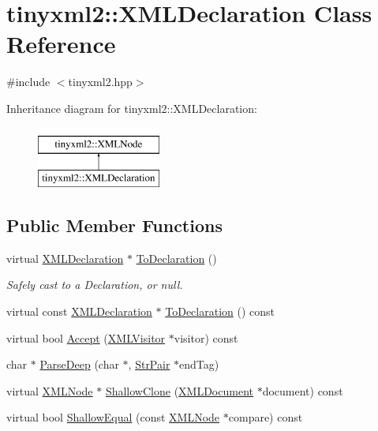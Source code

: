 \hypertarget{classtinyxml2_1_1_x_m_l_declaration}{\section{tinyxml2\-:\-:X\-M\-L\-Declaration Class Reference}
\label{classtinyxml2_1_1_x_m_l_declaration}
}


{\ttfamily \#include $<$tinyxml2.\-hpp$>$}

Inheritance diagram for tinyxml2\-:\-:X\-M\-L\-Declaration\-:\begin{figure}[H]
\begin{center}
\leavevmode
\includegraphics[height=2.000000cm]{classtinyxml2_1_1_x_m_l_declaration}
\end{center}
\end{figure}
\subsection*{Public Member Functions}
\begin{DoxyCompactItemize}
\item 
virtual \hyperlink{classtinyxml2_1_1_x_m_l_declaration}{X\-M\-L\-Declaration} $\ast$ \hyperlink{classtinyxml2_1_1_x_m_l_declaration_a159d8ac45865215e88059ea1e5b52fc5}{To\-Declaration} ()
\begin{DoxyCompactList}\small\item\em Safely cast to a Declaration, or null. \end{DoxyCompactList}\item 
virtual const \hyperlink{classtinyxml2_1_1_x_m_l_declaration}{X\-M\-L\-Declaration} $\ast$ \hyperlink{classtinyxml2_1_1_x_m_l_declaration_af724607a5fa810496fd6a21f5975a643}{To\-Declaration} () const 
\item 
virtual bool \hyperlink{classtinyxml2_1_1_x_m_l_declaration_a953a7359cc312d15218eb5843a4ca108}{Accept} (\hyperlink{classtinyxml2_1_1_x_m_l_visitor}{X\-M\-L\-Visitor} $\ast$visitor) const 
\item 
char $\ast$ \hyperlink{classtinyxml2_1_1_x_m_l_declaration_a19e33e0a9f9500f449261558c36f9a44}{Parse\-Deep} (char $\ast$, \hyperlink{classtinyxml2_1_1_str_pair}{Str\-Pair} $\ast$end\-Tag)
\item 
virtual \hyperlink{classtinyxml2_1_1_x_m_l_node}{X\-M\-L\-Node} $\ast$ \hyperlink{classtinyxml2_1_1_x_m_l_declaration_a39458732ee6796cfc85dd35d3c488e0b}{Shallow\-Clone} (\hyperlink{classtinyxml2_1_1_x_m_l_document}{X\-M\-L\-Document} $\ast$document) const 
\item 
virtual bool \hyperlink{classtinyxml2_1_1_x_m_l_declaration_ace0d2d9bc1b63278bd5e984ebe0c7bd0}{Shallow\-Equal} (const \hyperlink{classtinyxml2_1_1_x_m_l_node}{X\-M\-L\-Node} $\ast$compare) const 
\end{DoxyCompactItemize}
